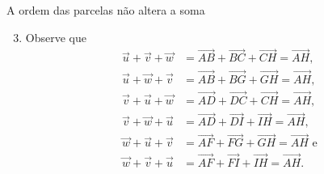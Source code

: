 \begin{answer}{A ordem das parcelas não altera a soma}
{
\begin{enumerate}\setcounter{enumi}{2}
\item Observe que 
\begin{align*}
\vec{u} + \vec{v} + \vec{w} &= \overrightarrow{AB} + \overrightarrow{BC} + \overrightarrow{CH} = \overrightarrow{AH},\\ 
\vec{u} + \vec{w} + \vec{v} &= \overrightarrow{AB} + \overrightarrow{BG} + \overrightarrow{GH} = \overrightarrow{AH},\\
\vec{v} + \vec{u} + \vec{w} &= \overrightarrow{AD} + \overrightarrow{DC} + \overrightarrow{CH} = \overrightarrow{AH}, \\
\vec{v} + \vec{w} + \vec{u} &= \overrightarrow{AD} + \overrightarrow{DI} + \overrightarrow{IH} = \overrightarrow{AH}, \\
\vec{w} + \vec{u} + \vec{v} &= \overrightarrow{AF} + \overrightarrow{FG} + \overrightarrow{GH} = \overrightarrow{AH}\text{ e}\\
\vec{w} + \vec{v} + \vec{u} &= \overrightarrow{AF} + \overrightarrow{FI} + \overrightarrow{IH} = \overrightarrow{AH}.
\end{align*}


\begin{marginfigure}[H]
\centering


\end{marginfigure}
\end{enumerate}}
\end{answer}
